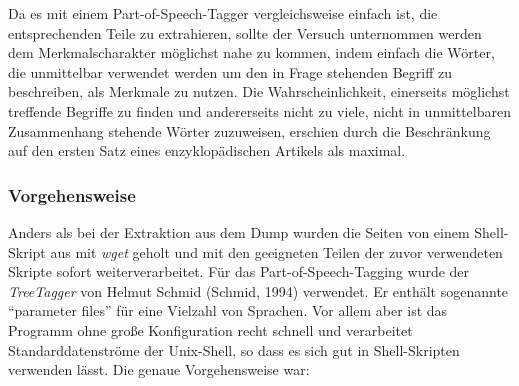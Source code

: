\documentclass[pagesize,DIV=calc,12pt,final]{scrreprt}
\begin{document}
Da es mit einem Part-of-Speech-Tagger vergleichsweise einfach ist, die entsprechenden Teile zu extrahieren, sollte der Versuch unternommen werden dem Merkmalscharakter möglichst nahe zu kommen, indem einfach die Wörter, die unmittelbar verwendet werden um den in Frage stehenden Begriff zu beschreiben, als Merkmale zu nutzen. 
Die Wahrscheinlichkeit, einerseits möglichst treffende Begriffe zu finden und andererseits nicht zu viele, nicht in unmittelbaren Zusammenhang stehende Wörter zuzuweisen, erschien durch die Beschränkung auf den ersten Satz eines enzyklopädischen Artikels als maximal. 

\subsubsection{Vorgehensweise}

Anders als bei der Extraktion aus dem Dump wurden die Seiten von einem Shell-Skript aus mit \emph{wget} geholt und mit den geeigneten Teilen der zuvor verwendeten Skripte sofort weiterverarbeitet. 
Für das Part-of-Speech-Tagging wurde der \emph{TreeTagger} von Helmut Schmid (Schmid, 1994) verwendet.
Er enthält sogenannte \enquote{parameter files} für eine Vielzahl von Sprachen. 
Vor allem aber ist das Programm ohne große Konfiguration recht schnell und verarbeitet Standarddatenströme der Unix-Shell, so dass es sich gut in Shell-Skripten verwenden lässt. 
Die genaue Vorgehensweise war: 
\end{document}

